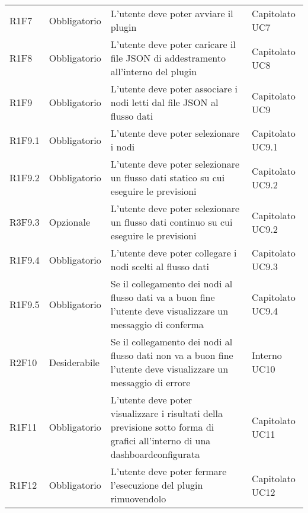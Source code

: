 \begin{longtable} {
		>{}p{24mm} 
		>{}p{32mm}
		>{}p{40mm} 
		>{}p{24.5mm}
		}
		R1F7 & Obbligatorio & L'utente deve poter avviare il plugin & Capitolato UC7 \TBstrut \\ [2mm]
		R1F8 & Obbligatorio & L'utente deve poter caricare il file JSON di addestramento all'interno del plugin & Capitolato UC8 \TBstrut \\ [2mm]
		R1F9 & Obbligatorio & L'utente deve poter associare i nodi letti dal file JSON al flusso dati & Capitolato UC9 \TBstrut \\ [2mm]
		R1F9.1 & Obbligatorio & L'utente deve poter selezionare i nodi & Capitolato UC9.1 \TBstrut \\ [2mm]
		R1F9.2 & Obbligatorio & L'utente deve poter selezionare un flusso dati statico su cui eseguire le previsioni & Capitolato UC9.2 \TBstrut \\ [2mm]
		R3F9.3 & Opzionale & L'utente deve poter selezionare un flusso dati continuo su cui eseguire le previsioni & Capitolato UC9.2 \TBstrut \\ [2mm]
		R1F9.4 & Obbligatorio & L'utente deve poter collegare i nodi scelti al flusso dati& Capitolato UC9.3 \TBstrut \\ [2mm]
		R1F9.5 & Obbligatorio & Se il collegamento dei nodi al flusso dati va a buon fine l'utente deve visualizzare un messaggio di conferma & Capitolato UC9.4 \TBstrut \\ [2mm]
		R2F10 & Desiderabile & Se il collegamento dei nodi al flusso dati non va a buon fine l'utente deve visualizzare un messaggio di errore & Interno UC10 \TBstrut \\ [2mm]
		R1F11 & Obbligatorio & L'utente deve poter visualizzare i risultati della previsione sotto forma di grafici all'interno di una dashboard\glosp configurata & Capitolato UC11 \TBstrut \\ [2mm]
		R1F12 & Obbligatorio & L'utente deve poter fermare l'esecuzione del plugin rimuovendolo & Capitolato UC12 \TBstrut \\ [2mm]		
		

\end{longtable}
